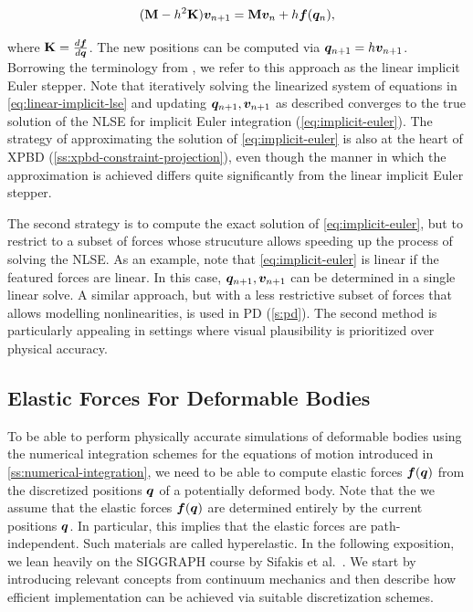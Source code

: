 \begin{equation}\label{eq:linear-implicit-stepper}
    (\mathbf{M} - h^2\mathbf{K})\bm{v}_{n+1} = \mathbf{M}\bm{v}_n + h\bm{f}(\bm{q}_n),
\end{equation}

\noindent where $\mathbf{K} = \frac{d\bm{f}}{d\bm{q}}$. The new positions can be computed via $\bm{q}_{n+1} = h \bm{v}_{n+1}$. 
Borrowing the terminology from \cite{servin2006}, we refer to this approach as the linear implicit Euler stepper. Note that iteratively solving
the linearized system of equations in \autoref{eq:linear-implicit-lse} and updating $\bm{q}_{n+1}, \bm{v}_{n+1}$ as described converges to 
the true solution of the NLSE for implicit Euler integration (\cref{eq:implicit-euler}). The strategy of approximating the solution of 
\autoref{eq:implicit-euler} is also at the heart of XPBD (\cref{ss:xpbd-constraint-projection}), even though the manner in which the 
approximation is achieved differs quite significantly from the linear implicit Euler stepper.

The second strategy is to compute the exact solution of \autoref{eq:implicit-euler}, but to restrict to a subset of forces whose strucuture 
allows speeding up the process of solving the NLSE. As an example, note that \autoref{eq:implicit-euler} is linear if the featured forces 
are linear. In this case, $\bm{q}_{n+1}, \bm{v}_{n+1}$ can be determined in a single linear solve. A similar approach, but with a less 
restrictive subset of forces that allows modelling nonlinearities, is used in PD (\cref{s:pd}). The second method is particularly appealing 
in settings where visual plausibility is prioritized over physical accuracy.

\subsection{Elastic Forces For Deformable Bodies}\label{ss:deformable-bodies}
To be able to perform physically accurate simulations of deformable bodies using the numerical integration schemes for the equations of motion 
introduced in \autoref{ss:numerical-integration}, we need to be able to compute elastic forces $\bm{f}(\bm{q})$ from the discretized 
positions $\bm{q}$ of a potentially deformed body. Note that the we assume that the elastic forces $\bm{f}(\bm{q})$ are determined 
entirely by the current positions $\bm{q}$. In particular, this implies that the elastic forces are path-independent. Such materials are called 
hyperelastic. In the following exposition, we lean heavily on the SIGGRAPH course by Sifakis et al.\ \cite{sifakis2012}. We start by 
introducing relevant concepts from continuum mechanics and then describe how efficient implementation can be achieved via suitable 
discretization schemes.

